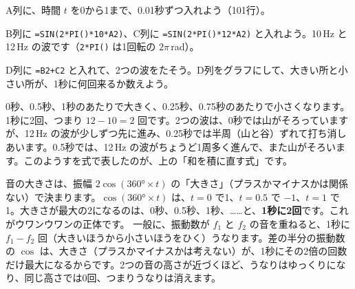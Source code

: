 \begin{yattemiyou}
\begin{enumerate}[label={\bkcircled[bkGreen]{\arabic*}}, leftmargin=2.4\zw, itemsep=1pt, topsep=0pt]
\item A列に、時間 $t$ を0から1まで、0.01秒ずつ入れよう（101行）。
\item B列に \texttt{=SIN(2*PI()*10*A2)}、C列に \texttt{=SIN(2*PI()*12*A2)} と入れよう。10\,Hz と12\,Hz の波です（\texttt{2*PI()} は1回転の $2\pi$\,rad）。
\item D列に \texttt{=B2+C2} と入れて、2つの波をたそう。D列をグラフにして、大きい所と小さい所が、1秒に何回来るか数えよう。
\end{enumerate}
\begin{bkcenter}
\end{bkcenter}
\end{yattemiyou}

\noindent 0秒、0.5秒、1秒のあたりで大きく、0.25秒、0.75秒のあたりで小さくなります。1秒に2回、つまり $12-10=2$ 回です。2つの波は、0秒では山がそろっていますが、12\,Hz の波が少しずつ先に進み、0.25秒では半周（山と谷）ずれて打ち消しあいます。0.5秒では、12\,Hz の波がちょうど1周多く進んで、また山がそろいます。このようすを式で表したのが、上の「和を積に直す式」です。

音の大きさは、振幅 $2\cos(360°\times t)$ の「大きさ」（プラスかマイナスかは関係ない）で決まります。$\cos(360°\times t)$ は、$t=0$ で1、$t=0.5$ で $-1$、$t=1$ で1。大きさが最大の2になるのは、0秒、0.5秒、1秒、……と、\textbf{1秒に2回}です。これがウワンウワンの正体です。
一般に、振動数が $f_1$ と $f_2$ の音を重ねると、1秒に $f_1-f_2$ 回（大きいほうから小さいほうをひく）うなります。差の半分の振動数の $\cos$ は、大きさ（プラスかマイナスかは考えない）が、1秒にその2倍の回数だけ最大になるからです。2つの音の高さが近づくほど、うなりはゆっくりになり、同じ高さでは0回、つまりうなりは消えます。

